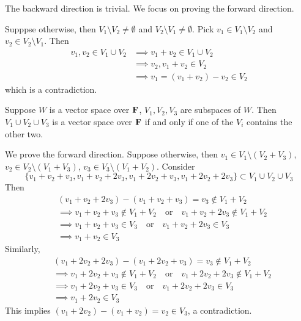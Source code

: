 \begin{solution}
The backward direction is trivial. We focus on proving the forward direction.

Supppse otherwise, then $V_1\setminus V_2\neq\emptyset$ and $V_2\setminus V_1\neq\emptyset$. Pick $v_1\in V_1\setminus V_2$ and $v_2\in V_2\setminus V_1$. Then
\begin{align*}
v_1,v_2\in V_1\cup V_2&\implies v_1+v_2\in V_1\cup V_2\\
&\implies v_2,v_1+v_2\in V_2\\
&\implies v_1=(v_1+v_2)-v_2\in V_2
\end{align*}
which is a contradiction.
\end{solution}

\begin{prbm}
Suppose $W$ is a vector space over $\mathbf F$, $V_1,V_2,V_3$ are subspaces of $W$. Then $V_1\cup V_2\cup V_3$ is a vector space over $\mathbf F$ if and only if one of the $V_i$ contains the other two.
\end{prbm}

\begin{solution}
We prove the forward direction. Suppose otherwise, then $v_1\in V_1\setminus(V_2+V_3)$, $v_2\in V_2\setminus(V_1+V_3)$, $v_3\in V_3\setminus(V_1+V_2)$. Consider
\[\{v_1+v_2+v_3,v_1+v_2+2v_3,v_1+2v_2+v_3,v_1+2v_2+2v_3\}\subset V_1\cup V_2\cup V_3\]
Then
\begin{align*}
&(v_1+v_2+2v_3)-(v_1+v_2+v_3)=v_3\notin V_1+V_2\\
&\implies v_1+v_2+v_3\notin V_1+V_2\quad\text{or}\quad v_1+v_2+2v_3\notin V_1+V_2\\
&\implies v_1+v_2+v_3\in V_3\quad\text{or}\quad v_1+v_2+2v_3\in V_3\\
&\implies v_1+v_2\in V_3
\end{align*}
Similarly,
\begin{align*}
&(v_1+2v_2+2v_3)-(v_1+2v_2+v_3)=v_3\notin V_1+V_2\\
&\implies v_1+2v_2+v_3\notin V_1+V_2\quad\text{or}\quad v_1+2v_2+2v_3\notin V_1+V_2\\
&\implies v_1+2v_2+v_3\in V_3\quad\text{or}\quad v_1+2v_2+2v_3\in V_3\\
&\implies v_1+2v_2\in V_3
\end{align*}
This implies $(v_1+2v_2)-(v_1+v_2)=v_2\in V_3$, a contradiction.
\end{solution}